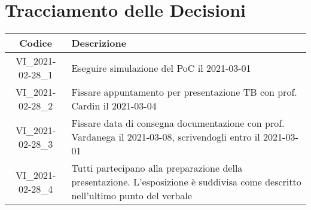 \section*{Tracciamento delle Decisioni}

\begin{center}
	\begin{longtable}{|c|p{13cm}|}
	\hline
	\rowcolor{lighter-grayer}
	\textbf{Codice} & \textbf{Descrizione} \\
	\hline
	\endfirsthead

	\hline
	VI\_2021-02-28\_1 & Eseguire simulazione del PoC il 2021-03-01\\
	VI\_2021-02-28\_2 & Fissare appuntamento per presentazione TB con prof. Cardin il 2021-03-04  \\
	VI\_2021-02-28\_3 & Fissare data di consegna documentazione con prof. Vardanega il 2021-03-08, scrivendogli entro il 2021-03-01 \\
	VI\_2021-02-28\_4 & Tutti partecipano alla preparazione della presentazione. L'esposizione è suddivisa come descritto nell'ultimo punto del verbale \\
	\hline

	\end{longtable}
\end{center}